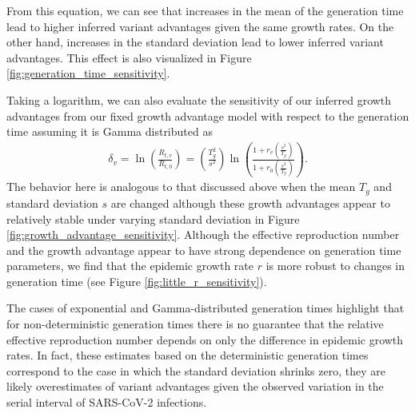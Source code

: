 \documentclass[11pt,oneside,letterpaper]{article}
\begin{document}
From this equation, we can see that increases in the mean of the generation time lead to higher inferred variant advantages given the same growth rates.
On the other hand, increases in the standard deviation lead to lower inferred variant advantages. This effect is also visualized in Figure \ref{fig:generation_time_sensitivity}.

Taking a logarithm, we can also evaluate the sensitivity of our inferred growth advantages from our fixed growth advantage model with respect to the generation time assuming it is Gamma distributed as
\begin{align*}
 \delta_{v}  = \ln \left( \frac{R_{t,v}}{R_{t,0}} \right) = \left( \frac{T_{g}^{2}}{s^{2}} \right)  \ln \left( \frac{1 + r_{v}  \left(\frac{s^{2}}{T_{g}}\right)}{1 + r_{0} \left(\frac{s^{2}}{T_{g}}\right) } \right).
\end{align*}
The behavior here is analogous to that discussed above when the mean $T_{g}$ and standard deviation $s$ are changed although these growth advantages appear to relatively stable under varying standard deviation in Figure \ref{fig:growth_advantage_sensitivity}.
Although the effective reproduction number and the growth advantage appear to have strong dependence on generation time parameters, we find that the epidemic growth rate $r$ is more robust to changes in generation time (see Figure \ref{fig:little_r_sensitivity}).

The cases of exponential and Gamma-distributed generation times highlight that for non-deterministic generation times there is no guarantee that the relative effective reproduction number depends on only the difference in epidemic growth rates.
In fact, these estimates based on the deterministic generation times correspond to the case in which the standard deviation shrinks zero, they are likely overestimates of variant advantages given the observed variation in the serial interval of SARS-CoV-2 infections.
\end{document}
